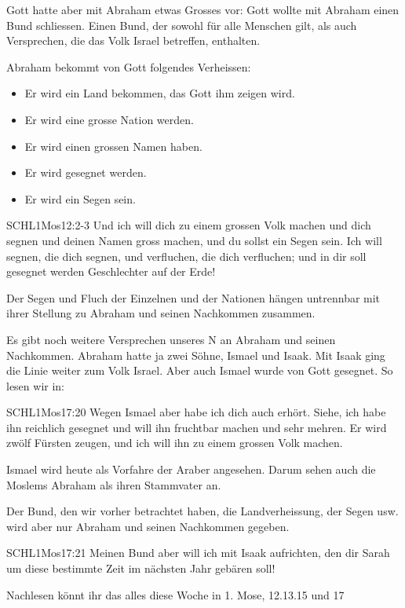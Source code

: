        Gott hatte aber mit Abraham etwas Grosses vor: Gott wollte mit Abraham einen Bund schliessen. Einen Bund, der sowohl für alle Menschen gilt, als auch Versprechen, die das Volk Israel betreffen, enthalten.

        Abraham bekommt von Gott folgendes Verheissen:
        \begin{itemize}
            \item Er wird ein Land bekommen, das Gott ihm zeigen wird.
            \item Er wird eine grosse Nation werden.
            \item Er wird einen grossen Namen haben.
            \item Er wird gesegnet werden.
            \item Er wird ein Segen sein.
        \end{itemize}
        \begin{bibelquote}{SCHL}{1Mos}{12:2-3}
            Und ich will dich zu einem grossen Volk machen und dich segnen und deinen Namen gross machen, und du sollst ein Segen sein. Ich will segnen, die dich segnen, und verfluchen, die dich verfluchen; und in dir soll gesegnet werden  Geschlechter auf der Erde!
        \end{bibelquote}
        Der Segen und Fluch der Einzelnen und der Nationen hängen untrennbar mit ihrer Stellung zu Abraham und seinen Nachkommen zusammen.

        Es gibt noch weitere Versprechen unseres \herr N an Abraham und seinen Nachkommen. Abraham hatte ja zwei Söhne, Ismael und Isaak. Mit Isaak ging die Linie weiter zum Volk Israel. Aber auch Ismael wurde von Gott gesegnet. So lesen wir in:
        \begin{bibelquote}{SCHL}{1Mos}{17:20}
            Wegen Ismael aber habe ich dich auch erhört. Siehe, ich habe ihn reichlich gesegnet und will ihn fruchtbar machen und sehr mehren. Er wird zwölf Fürsten zeugen, und ich will ihn zu einem grossen Volk machen.
        \end{bibelquote}
        Ismael wird heute als Vorfahre der Araber angesehen. Darum sehen auch die Moslems Abraham als ihren Stammvater an.

        Der Bund, den wir vorher betrachtet haben, die Landverheissung, der Segen usw. wird aber nur Abraham und seinen Nachkommen gegeben.
        \begin{bibelquote}{SCHL}{1Mos}{17:21}
            Meinen Bund aber will ich mit Isaak aufrichten, den dir Sarah um diese bestimmte Zeit im nächsten Jahr gebären soll!
        \end{bibelquote}
        Nachlesen könnt ihr das alles diese Woche in 1. Mose, 12.13.15 und 17

